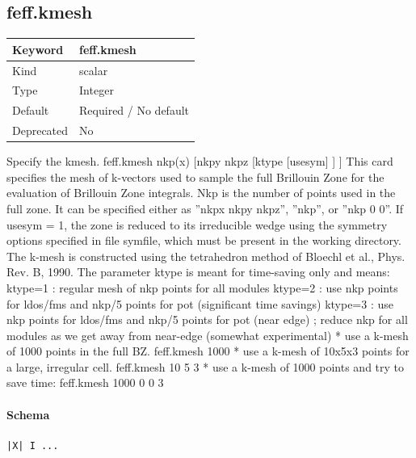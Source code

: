 \documentclass[11pt]{article}
\begin{document}
{{{\subsection{feff.kmesh}
\label{kw:feff-kmesh}
\begin{longtable}{|p{1.5in}|p{4.5in}|}
\hline
Keyword & feff.kmesh \\
\hline
Kind & scalar \\
\hline
Type & Integer \\
\hline
Default & Required / No default \\
\hline
Deprecated & No \\
\hline
\end{longtable}
 Specify the kmesh.
 feff.kmesh nkp(x) [nkpy nkpz [ktype [usesym] ] ]
 This card specifies the mesh of k-vectors used to sample the full Brillouin Zone for the evaluation
 of Brillouin Zone integrals. Nkp is the number of points used in the full zone. It can be specified
 either as ”nkpx nkpy nkpz”, ”nkp”, or ”nkp 0 0”. If usesym = 1, the zone is reduced to its
 irreducible wedge using the symmetry options specified in file symfile, which must be present
 in the working directory. The k-mesh is constructed using the tetrahedron method of Bloechl
 et al., Phys. Rev. B, 1990. The parameter ktype is meant for time-saving only and means:
  ktype=1 : regular mesh of nkp points for all modules
  ktype=2 : use nkp points for ldos/fms and nkp/5 points for pot (significant time savings)
  ktype=3 : use nkp points for ldos/fms and nkp/5 points for pot (near edge) ; reduce nkp
 for all modules as we get away from near-edge (somewhat experimental)
 * use a k-mesh of 1000 points in the full BZ.
 feff.kmesh{ 1000 }
 * use a k-mesh of 10x5x3 points for a large, irregular cell.
 feff.kmesh{ 10 5 3 }
 * use a k-mesh of 1000 points and try to save time:
 feff.kmesh{ 1000 0 0 3 }

\paragraph{Schema}
\begin{Verbatim}
|X| I ...
\end{Verbatim}

}}}
\end{document}
